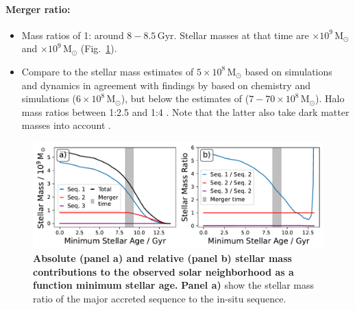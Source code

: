 \documentclass[fleqn,usenatbib]{mnras}
\begin{document}
\paragraph*{Merger ratio:}
\begin{itemize}
    \item Mass ratios of 1: around $8-8.5\,\mathrm{Gyr}$. Stellar masses at that time are $\times10^9\,\mathrm{M_\odot}$ and $\times10^9\,\mathrm{M_\odot}$
    (Fig.~\ref{fig:sequence_mass_ratios}).
    \item Compare to the stellar mass estimates of $5\times10^{8}\,\mathrm{M_\odot}$ based on simulations and dynamics \citep{Naidu2021} in agreement with findings by \citet{Helmi2018} based on chemistry and simulations ($6\times 10^{8}\,\mathrm{M_\odot}$), but below the estimates of \citet{Feuillet2020} ($7-70\times10^{8}\,\mathrm{M_\odot}$). Halo mass ratios between 1:2.5 \citep{Naidu2020} and 1:4 \citep{Helmi2018}. Note that the latter also take dark matter masses into account \citep[e.g. $2\times10^{11}\,\mathrm{M_\odot}$ for][]{Naidu2020}.
\end{itemize}

\begin{figure}
	\includegraphics[width=\columnwidth]{figures/sequence_mass_ratios.pdf}
    \caption{
    \textbf{Absolute (panel a) and relative (panel b) stellar mass contributions to the observed solar neighborhood as a function minimum stellar age.}
    \textbf{Panel a)} show the stellar mass ratio of the major accreted sequence to the in-situ sequence.
    }
    \label{fig:sequence_mass_ratios}
\end{figure}
\end{document}
